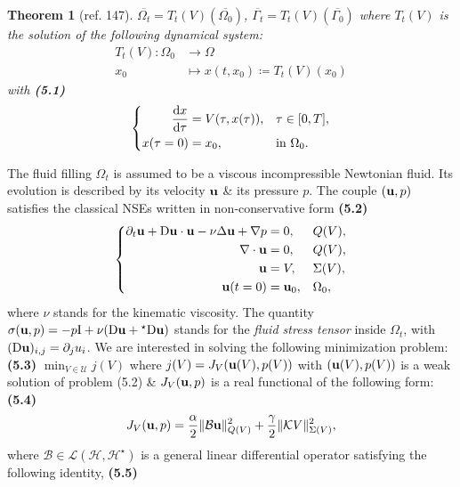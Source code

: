 \documentclass[oneside]{book}
\numberwithin{equation}{section}
\newtheorem{theorem}{Theorem}[chapter]
\begin{document}
\begin{theorem}[ref. 147]
	$\overline{\Omega_t} = T_t(V)(\overline{\Omega_0})$, $\overline{\Gamma_t} = T_t(V)(\overline{\Gamma_0})$ where $T_t(V)$ is the solution of the following dynamical system:
	\begin{align*}
		T_t(V):\Omega_0&\to\Omega\\
		x_0&\mapsto x(t,x_0)\coloneqq T_t(V)(x_0)
	\end{align*}
	with \textbf{(5.1)}
	\begin{equation*}
		\left\{\begin{split}
			\frac{{\rm d}x}{{\rm d}\tau} &= V(\tau,x(\tau)),&&\tau\in[0,T],\\
			x(\tau = 0) &= x_0,&&\mbox{in }\Omega_0.
		\end{split}\right.
	\end{equation*}
\end{theorem}
The fluid filling $\Omega_t$ is assumed to be a viscous incompressible Newtonian fluid. Its evolution is described by its velocity ${\bf u}$ \& its pressure $p$. The couple $({\bf u},p)$ satisfies the classical NSEs written in non-conservative form \textbf{(5.2)}
\begin{equation*}
	\left\{\begin{split}
		\partial_t{\bf u} + {\rm D}{\bf u}\cdot{\bf u} - \nu\Delta{\bf u} + \nabla p &= 0,&&Q(V),\\
		\nabla\cdot{\bf u} &= 0,&&Q(V),\\
		{\bf u} &= V,&&\Sigma(V),\\
		{\bf u}(t = 0) &= {\bf u}_0,&&\Omega_0,
	\end{split}\right.
\end{equation*}
where $\nu$ stands for the kinematic viscosity. The quantity $\sigma({\bf u},p) = -p{\rm I} + \nu({\rm D}{\bf u} + {}^\star{\rm D}{\bf u})$ stands for the \textit{fluid stress tensor} inside $\Omega_t$, with $({\rm D}{\bf u})_{i,j} = \partial_ju_i$. We are interested in solving the following minimization problem: \textbf{(5.3)} $\min_{V\in\mathcal{U}} j(V)$ where $j(V) = J_V({\bf u}(V),p(V))$ with $({\bf u}(V),p(V))$ is a weak solution of problem (5.2) \& $J_V({\bf u},p)$ is a real functional of the following form: \textbf{(5.4)}
\begin{align*}
	J_V({\bf u},p) = \frac{\alpha}{2}\|\mathcal{B}{\bf u}\|_{Q(V)}^2 + \frac{\gamma}{2}\|\mathcal{K}V\|_{\Sigma(V)}^2,
\end{align*}
where $\mathcal{B}\in\mathcal{L}(\mathcal{H},\mathcal{H}^\star)$ is a general linear differential operator satisfying the following identity, \textbf{(5.5)}
\end{document}
